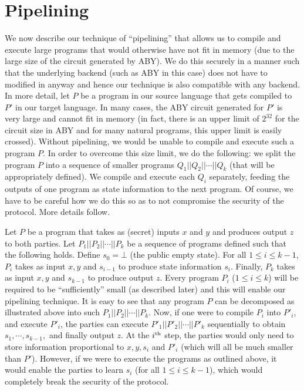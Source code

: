 \section{Pipelining}
\label{sec:pipe}
We now describe our technique of ``pipelining'' that allows us to compile and execute large programs that would otherwise have not fit in memory (due to the large size of the circuit generated by ABY). We do this securely in a manner such that the underlying backend (such as ABY in this case) does not have to modified in anyway and hence our technique is also compatible with any backend. In more detail, let $P$ be a program in our source language that gets compiled to $P'$ in our target language. In many cases, the ABY circuit generated for $P'$ is very large and cannot fit in memory (in fact, there is an upper limit of $2^{32}$ for the circuit size in ABY and for many natural programs, this upper limit is easily crossed). Without pipelining, we would be unable to compile and execute such a program $P$. In order to overcome this size limit, we do the following: we split the program $P$ into a sequence of smaller programs $Q_1||Q_2||\cdots||Q_k$ (that will be appropriately defined). We compile and execute each $Q_i$ separately, feeding the outputs of one program as state information to the next program. Of course, we have to be careful how we do this so as to not compromise the security of the protocol. More details follow.

Let $P$ be a program that takes as (secret) inputs $x$ and $y$ and produces output $z$ to both parties. Let $P_1||P_2||\cdots||P_k$ be a sequence of programs defined such that the following holds. Define $s_0 = \bot$ (the public empty state). For all $1\leq i\leq k-1$, $P_i$ takes as input $x, y$ and $s_{i-1}$ to produce state information $s_i$. Finally, $P_k$ takes as input $x,y$ and $s_{k-1}$ to produce output $z$. Every program $P_i$ ($1\leq i\leq k$) will be required to be ``sufficiently'' small (as described later) and this will enable our pipelining technique. It is easy to see that any program $P$ can be decomposed as illustrated above into such $P_1||P_2||\cdots||P_k$. Now, if one were to compile $P_i$ into $P'_i$, and execute $P'_i$, the parties can execute $P'_1||P'_2||\cdots||P'_k$ sequentially to obtain $s_1,\cdots,s_{k-1},$ and finally output $z$. At the $i^{\textrm{\tiny{th}}}$ step, the parties would only need to store information proportional to $x,y,s_i$ and $P'_i$ (which will all be much smaller than $P'$). However, if we were to execute the programs as outlined above, it would enable the parties to learn $s_i$ (for all $1\leq i\leq k-1$), which would completely break the security of the protocol.

